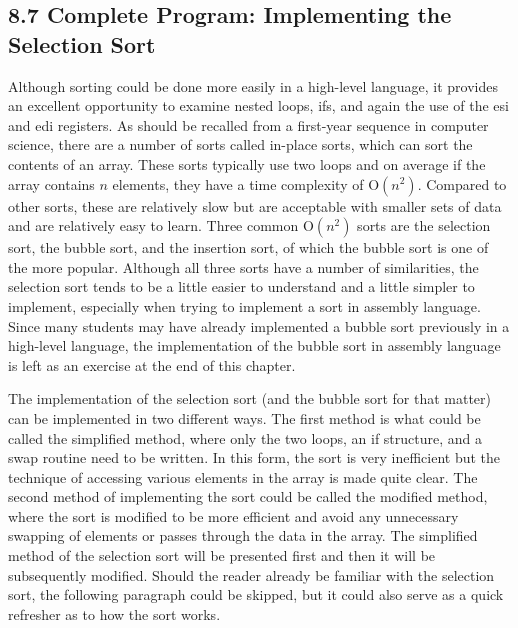 \documentclass[10pt]{article}
\begin{document}
\subsection*{8.7 Complete Program: Implementing the Selection Sort}
Although sorting could be done more easily in a high-level language, it provides an excellent opportunity to examine nested loops, ifs, and again the use of the esi and edi registers. As should be recalled from a first-year sequence in computer science, there are a number of sorts called in-place sorts, which can sort the contents of an array. These sorts typically use two loops and on average if the array contains $n$ elements, they have a time complexity of $\mathrm{O}\left(n^{2}\right)$. Compared to other sorts, these are relatively slow but are acceptable with smaller sets of data and are relatively easy to learn. Three common $\mathrm{O}\left(n^{2}\right)$ sorts are the selection sort, the bubble sort, and the insertion sort, of which the bubble sort is one of the more popular. Although all three sorts have a number of similarities, the selection sort tends to be a little easier to understand and a little simpler to implement, especially when trying to implement a sort in assembly language. Since many students may have already implemented a bubble sort previously in a high-level language, the implementation of the bubble sort in assembly language is left as an exercise at the end of this chapter.

The implementation of the selection sort (and the bubble sort for that matter) can be implemented in two different ways. The first method is what could be called the simplified method, where only the two loops, an if structure, and a swap routine need to be written. In this form, the sort is very inefficient but the technique of accessing various elements in the array is made quite clear. The second method of implementing the sort could be called the modified method, where the sort is modified to be more efficient and avoid any unnecessary swapping of elements or passes through the data in the array. The simplified method of the selection sort will be presented first and then it will be subsequently modified. Should the reader already be familiar with the selection sort, the following paragraph could be skipped, but it could also serve as a quick refresher as to how the sort works.
\end{document}
